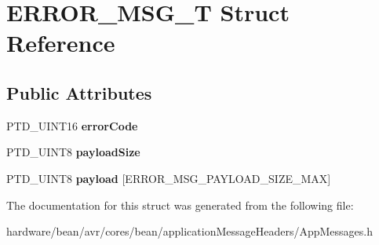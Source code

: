 \hypertarget{struct_e_r_r_o_r___m_s_g___t}{}\section{E\+R\+R\+O\+R\+\_\+\+M\+S\+G\+\_\+T Struct Reference}
\label{struct_e_r_r_o_r___m_s_g___t}
\subsection*{Public Attributes}
\begin{DoxyCompactItemize}
\item 
P\+T\+D\+\_\+\+U\+I\+N\+T16 {\bfseries error\+Code}\hypertarget{struct_e_r_r_o_r___m_s_g___t_a5ebd68786cc6a3da920b024bab348688}{}\label{struct_e_r_r_o_r___m_s_g___t_a5ebd68786cc6a3da920b024bab348688}

\item 
P\+T\+D\+\_\+\+U\+I\+N\+T8 {\bfseries payload\+Size}\hypertarget{struct_e_r_r_o_r___m_s_g___t_ae3c5534a4496df5e1c0bf78cc1d94d2b}{}\label{struct_e_r_r_o_r___m_s_g___t_ae3c5534a4496df5e1c0bf78cc1d94d2b}

\item 
P\+T\+D\+\_\+\+U\+I\+N\+T8 {\bfseries payload} \mbox{[}E\+R\+R\+O\+R\+\_\+\+M\+S\+G\+\_\+\+P\+A\+Y\+L\+O\+A\+D\+\_\+\+S\+I\+Z\+E\+\_\+\+M\+AX\mbox{]}\hypertarget{struct_e_r_r_o_r___m_s_g___t_a19a3c7a07290ee567d6e101b5a36312c}{}\label{struct_e_r_r_o_r___m_s_g___t_a19a3c7a07290ee567d6e101b5a36312c}

\end{DoxyCompactItemize}


The documentation for this struct was generated from the following file\+:\begin{DoxyCompactItemize}
\item 
hardware/bean/avr/cores/bean/application\+Message\+Headers/App\+Messages.\+h\end{DoxyCompactItemize}
